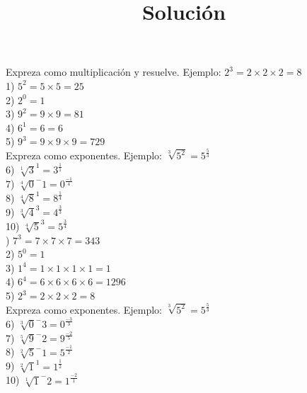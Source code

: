 \documentclass[a4paper,12pt]{article}
\title{Solución}
\author{}
\date{}
\begin{document}
\maketitle
 Expreza como multiplicación y  resuelve.
 Ejemplo: $2^3=2 \times 2 \times 2 = 8$  \vspace{0.5cm}\\ 
1) $5^2=5\times  5=25$ \vspace{1cm}\\ 
2) $2^0= 1$ \vspace{1cm}\\ 
3) $9^2=9\times  9=81$ \vspace{1cm}\\ 
4) $6^1= 6=6$ \vspace{1cm}\\ 
5) $9^3=9\times 9\times  9=729$ \vspace{1cm}\\ 
 Expreza como exponentes.
 Ejemplo: $\sqrt[3]{5^2}=5^\frac{5}{3} $  \vspace{0.5cm}\\ 
6) $\sqrt[1]{3}^1=3^\frac{1}{1 }$\vspace{1cm}\\ 
7) $\sqrt[4]{0}^-1=0^\frac{-1}{4 }$\vspace{1cm}\\ 
8) $\sqrt[4]{8}^1=8^\frac{1}{4 }$\vspace{1cm}\\ 
9) $\sqrt[3]{4}^3=4^\frac{3}{3 }$\vspace{1cm}\\ 
10) $\sqrt[4]{5}^3=5^\frac{3}{4 }$\vspace{1cm}\\ 

 ) $7^3=7\times 7\times  7=343$ \vspace{1cm}\\ 
2) $5^0= 1$ \vspace{1cm}\\ 
3) $1^4=1\times 1\times 1\times  1=1$ \vspace{1cm}\\ 
4) $6^4=6\times 6\times 6\times  6=1296$ \vspace{1cm}\\ 
5) $2^3=2\times 2\times  2=8$ \vspace{1cm}\\ 
 Expreza como exponentes.
 Ejemplo: $\sqrt[3]{5^2}=5^\frac{5}{3} $  \vspace{0.5cm}\\ 
6) $\sqrt[3]{0}^-3=0^\frac{-3}{3 }$\vspace{1cm}\\ 
7) $\sqrt[5]{9}^-2=9^\frac{-2}{5 }$\vspace{1cm}\\ 
8) $\sqrt[2]{5}^-1=5^\frac{-1}{2 }$\vspace{1cm}\\ 
9) $\sqrt[2]{1}^1=1^\frac{1}{2 }$\vspace{1cm}\\ 
10) $\sqrt[1]{1}^-2=1^\frac{-2}{1 }$\vspace{1cm}\\ 
\end{document}
